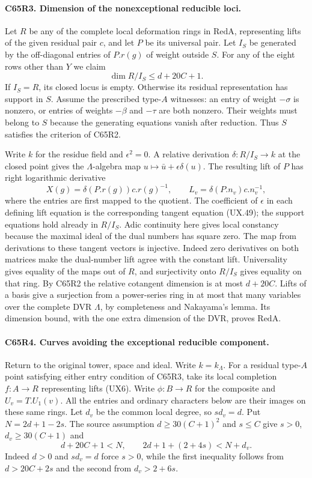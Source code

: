 \paragraph{C65R3. Dimension of the nonexceptional reducible loci.}
Let $R$ be any of the complete local deformation rings in
$\mathrm{RedA}$, representing lifts of the given residual pair $c$,
and let $P$ be its universal pair. Let $I_S$ be generated by the
off-diagonal entries of $P.r(g)$ of weight outside $S$. For any
of the eight rows other than $Y$ we claim
\[
                  \dim R/I_S\le d+20C+1 .
\]
If $I_S=R$, its closed locus is empty. Otherwise its residual
representation has support in $S$. Assume the prescribed type-$A$
witnesses: an entry of weight $-\sigma$ is nonzero, or entries of
weights $-\beta$ and $-\tau$ are both nonzero. Their weights must
belong to $S$ because the generating equations vanish after reduction.
Thus $S$ satisfies the criterion of C65R2.

Write $k$ for the residue field and $\epsilon^2=0$. A relative
derivation $\delta:R/I_S\to k$ at the closed point gives the
$\Lambda$-algebra map $u\mapsto\bar u+\epsilon\delta(u)$.
The resulting lift of $P$ has right logarithmic derivative
\[
   X(g)=\delta(P.r(g))c.r(g)^{-1},\qquad
   L_v=\delta(P.n_v)c.n_v^{-1},
\]
where the entries are first mapped to the quotient.
The coefficient of $\epsilon$ in each defining lift equation is
the corresponding tangent equation (UX.49); the support equations
hold already in $R/I_S$. Adic continuity here gives local constancy
because the maximal ideal of the dual numbers has square zero.
The map from derivations to these tangent vectors is injective.
Indeed zero derivatives on both matrices make the dual-number
lift agree with the constant lift. Universality gives equality of
the maps out of $R$, and surjectivity onto $R/I_S$ gives equality
on that ring. By C65R2 the relative cotangent dimension is at most
$d+20C$. Lifts of a basis give a surjection from a power-series
ring in at most that many variables over the complete DVR $\Lambda$,
by completeness and Nakayama's lemma. Its dimension bound, with the
one extra dimension of the DVR, proves $\mathrm{RedA}$.

\paragraph{C65R4. Curves avoiding the exceptional reducible component.}
Return to the original tower, space and ideal. Write $k=k_\Lambda$.
For a residual type-$A$ point satisfying either entry condition
of C65R3, take its local completion $f:A\to R$ representing lifts
(UX6). Write $\phi:B\to R$ for the composite and $U_v=T.U_1(v)$.
All the entries and ordinary characters below are their images on
these same rings. Let $d_v$ be the common local degree, so $s d_v=d$.
Put $N=2d+1-2s$. The source assumption $d\ge30(C+1)^2$ and
$s\le C$ give $s>0$, $d_v\ge30(C+1)$ and
\[
       d+20C+1<N,\qquad 2d+1+(2+4s)<N+d_v .
\]
Indeed $d>0$ and $s d_v=d$ force $s>0$, while the first
inequality follows from $d>20C+2s$ and the second from
$d_v>2+6s$.

